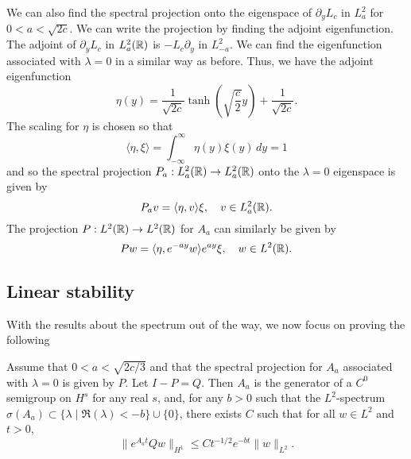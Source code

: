 We can also find the spectral projection onto the eigenspace of \(\partial_y L_c\) in \(L^2_a\) for \(0< a< \sqrt{2c}\). We can write the projection by finding the adjoint eigenfunction. The adjoint of \(\partial_y L_c\) in \(L^2_a(\mathbb{R})\) is \(-L_c\partial_y\) in \(L^2_{-a}\). We can find the eigenfunction associated with \(\lambda = 0\) in a similar way as before. Thus, we have the adjoint eigenfunction
\begin{equation}
	\eta(y) = \frac{1}{\sqrt{2c}} \tanh\left(\sqrt{\frac c 2 } y\right) + \frac{1}{\sqrt{2c}}.
\end{equation}
The scaling for \(\eta\) is chosen so that
\begin{equation}
	\langle \eta, \xi \rangle = \int_{-\infty}^\infty \eta(y) \xi(y) \, d y = 1
\end{equation}
and so the spectral projection \(P_a : L^2_a(\mathbb{R}) \to L_a^2(\mathbb{R})\) onto the \(\lambda = 0\) eigenspace is given by
\begin{equation}
	P_av = \langle \eta, v \rangle \xi, \quad v\in L^2_a(\mathbb{R}).
\end{equation}
The projection \(P:L^2(\mathbb{R}) \to L^2(\mathbb{R})\) for \(A_a\) can similarly be given by
\begin{equation}\label{spectral-projector}
	P w = \langle \eta, e^{-ay} w \rangle e^{ay} \xi, \quad w\in L^2(\mathbb{R}).
\end{equation}

\subsection{Linear stability}

With the results about the spectrum out of the way, we now focus on proving the following 

\begin{theorem}\label{linear-stability-kink}
	Assume that \(0<a<\sqrt{2c/3}\) and that the spectral projection for \(A_a\) associated with \(\lambda = 0\) is given by \(P\). Let \(I - P = Q.\) Then \(A_a\) is the generator of a \(C^0\) semigroup on \(H^s\) for any real \(s\), and, for any \(b>0\) such that the \(L^2\)-spectrum \(\sigma(A_a) \subset \{ \lambda \mid \Re(\lambda) < -b\} \cup \{0\}\), there exists \(C\) such that for all \(w\in L^2\) and \(t>0\),
	\begin{equation}\label{linear-decay-result}
		\| e^{A_a t} Qw \|_{H^1} \leq C t^{-1/2} e^{-bt} \| w \|_{L^2}.
	\end{equation}
\end{theorem}

